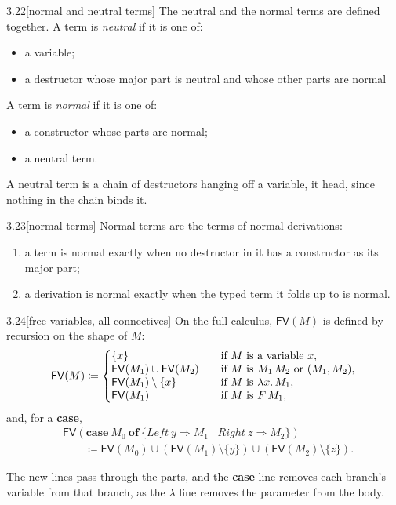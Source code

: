 \documentclass[a4paper, 11pt]{article}
\theoremstyle{definition}
\begin{document}
\begin{definition}{3.22}[normal and neutral terms]
  The neutral and the normal terms are defined together. A term is \textit{neutral} if it is one of:
  \begin{itemize}
    \item a variable;
    \item a destructor whose major part is neutral and whose other parts are normal
  \end{itemize}
  A term is \textit{normal} if it is one of:
  \begin{itemize}
    \item a constructor whose parts are normal;
    \item a neutral term.
  \end{itemize}

  A neutral term is a chain of destructors hanging off a variable, it head, since nothing in the chain binds it.
\end{definition}

\begin{lemma}{3.23}[normal terms]
  Normal terms are the terms of normal derivations:
  \begin{enumerate}
    \item a term is normal exactly when no destructor in it has a constructor as its major part;
    \item a derivation is normal exactly when the typed term it folds up to is normal.
  \end{enumerate}
\end{lemma}

\begin{definition}{3.24}[free variables, all connectives]
  On the full calculus, $\mathsf{FV}(M)$ is defined by recursion on the shape of $M$:
  \[
    \mathsf{FV}(M) \coloneqq
    \left\{
    \begin{array}{@{}l@{\qquad}l@{}}
      \{x\} & \text{if } M \text{ is a variable } x, \\
      \mathsf{FV}(M_1) \cup \mathsf{FV}(M_2) & \text{if } M \text{ is } M_1\, M_2 \text{ or } (M_1, M_2), \\
      \mathsf{FV}(M_1) \setminus \{x\} & \text{if } M \text{ is } \lambda x.\, M_1, \\
      \mathsf{FV}(M_1) & \text{if } M \text{ is } F\, M_1,
    \end{array}
    \right.
  \]
  and, for a \textbf{case},
  \begin{align*}
    &\mathsf{FV}(\mathbf{case}\ M_0\ \mathbf{of}\ \{\mathit{Left}\ y \Rightarrow M_1 \mid \mathit{Right}\ z \Rightarrow M_2\}) \\
    &\qquad \coloneqq \mathsf{FV}(M_0) \cup (\mathsf{FV}(M_1) \setminus \{y\}) \cup (\mathsf{FV}(M_2) \setminus \{z\}).
  \end{align*}
  
  The new lines pass through the parts, and the \textbf{case} line removes each branch's variable from that branch, as
  the $\lambda$ line removes the parameter from the body.
\end{definition}
\end{document}
